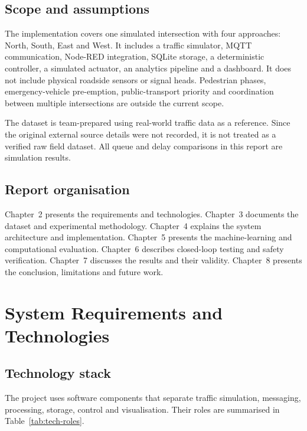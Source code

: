 \documentclass[12pt,a4paper,oneside]{report}
\begin{document}
\section{Scope and assumptions}
The implementation covers one simulated intersection with four approaches: North, South, East and West. It includes a traffic simulator, MQTT communication, Node-RED integration, SQLite storage, a deterministic controller, a simulated actuator, an analytics pipeline and a dashboard. It does not include physical roadside sensors or signal heads. Pedestrian phases, emergency-vehicle pre-emption, public-transport priority and coordination between multiple intersections are outside the current scope.

The dataset is team-prepared using real-world traffic data as a reference. Since the original external source details were not recorded, it is not treated as a verified raw field dataset. All queue and delay comparisons in this report are simulation results.

\section{Report organisation}
Chapter~2 presents the requirements and technologies. Chapter~3 documents the dataset and experimental methodology. Chapter~4 explains the system architecture and implementation. Chapter~5 presents the machine-learning and computational evaluation. Chapter~6 describes closed-loop testing and safety verification. Chapter~7 discusses the results and their validity. Chapter~8 presents the conclusion, limitations and future work.

\clearpage
\chapter{System Requirements and Technologies}
\section{Technology stack}
The project uses software components that separate traffic simulation, messaging, processing, storage, control and visualisation. Their roles are summarised in Table~\ref{tab:tech-roles}.
\end{document}
